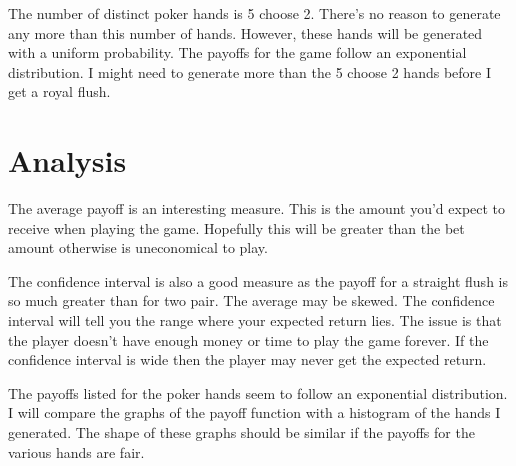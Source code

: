 \documentclass{article}
\begin{document}
The number of distinct poker hands is 5 choose 2.  There's no reason to 
generate any more than this number of hands.  However, these hands will 
be generated with a uniform probability.  The payoffs for the game follow
an exponential distribution.  I might need to generate more than the 5 choose
2 hands before I get a royal flush.  

\section{Analysis}
The average payoff is an interesting measure.  This is the amount 
you'd expect to receive when playing the game.  Hopefully this will be 
greater than the bet amount otherwise is uneconomical to play.  

The confidence interval is also a good measure as the payoff for 
a straight flush is so much greater than for two pair.  The average may
be skewed.  The confidence interval will tell you the range where your 
expected return lies.  The issue is that the player doesn't have enough 
money or time to play the game forever.  If the confidence interval is wide
then the player may never get the expected return.

The payoffs listed for the poker hands seem to follow an exponential 
distribution.  I will compare the graphs of the payoff function with 
a histogram of the hands I generated.  The shape of these graphs should
be similar if the payoffs for the various hands are fair.

\end{document}
